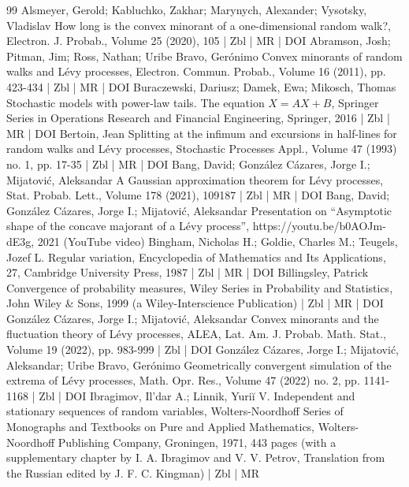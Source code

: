 \begin{thebibliography}{99}
Alsmeyer, Gerold; Kabluchko, Zakhar; Marynych, Alexander; Vysotsky, Vladislav How long is the convex minorant of a one-dimensional random walk?, Electron. J. Probab., Volume 25 (2020), 105 | Zbl | MR | DOI
Abramson, Josh; Pitman, Jim; Ross, Nathan; Uribe Bravo, Gerónimo Convex minorants of random walks and Lévy processes, Electron. Commun. Probab., Volume 16 (2011), pp. 423-434 | Zbl | MR | DOI
Buraczewski, Dariusz; Damek, Ewa; Mikosch, Thomas Stochastic models with power-law tails. The equation $X=AX+B$, Springer Series in Operations Research and Financial Engineering, Springer, 2016 | Zbl | MR | DOI
Bertoin, Jean Splitting at the infimum and excursions in half-lines for random walks and Lévy processes, Stochastic Processes Appl., Volume 47 (1993) no. 1, pp. 17-35 | Zbl | MR | DOI
Bang, David; González Cázares, Jorge I.; Mijatović, Aleksandar A Gaussian approximation theorem for Lévy processes, Stat. Probab. Lett., Volume 178 (2021), 109187 | Zbl | MR | DOI
Bang, David; González Cázares, Jorge I.; Mijatović, Aleksandar Presentation on “Asymptotic shape of the concave majorant of a Lévy process”, https://youtu.be/b0AOJm-dE3g, 2021 (YouTube video)
Bingham, Nicholas H.; Goldie, Charles M.; Teugels, Jozef L. Regular variation, Encyclopedia of Mathematics and Its Applications, 27, Cambridge University Press, 1987 | Zbl | MR | DOI
Billingsley, Patrick Convergence of probability measures, Wiley Series in Probability and Statistics, John Wiley \& Sons, 1999 (a Wiley-Interscience Publication) | Zbl | MR | DOI
González Cázares, Jorge I.; Mijatović, Aleksandar Convex minorants and the fluctuation theory of Lévy processes, ALEA, Lat. Am. J. Probab. Math. Stat., Volume 19 (2022), pp. 983-999 | Zbl | DOI
González Cázares, Jorge I.; Mijatović, Aleksandar; Uribe Bravo, Gerónimo Geometrically convergent simulation of the extrema of Lévy processes, Math. Opr. Res., Volume 47 (2022) no. 2, pp. 1141-1168 | Zbl | DOI
Ibragimov, Il’dar A.; Linnik, Yuriĭ V. Independent and stationary sequences of random variables, Wolters-Noordhoff Series of Monographs and Textbooks on Pure and Applied Mathematics, Wolters-Noordhoff Publishing Company, Groningen, 1971, 443 pages (with a supplementary chapter by I. A. Ibragimov and V. V. Petrov, Translation from the Russian edited by J. F. C. Kingman) | Zbl | MR

\end{thebibliography}
